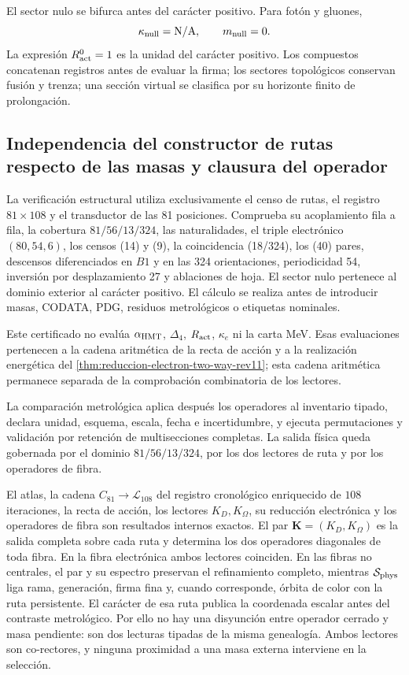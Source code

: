 El sector nulo se bifurca antes del carácter positivo. Para fotón y gluones,
\[
 \kappa_{\rm null}=\mathrm{N/A},
 \qquad m_{\rm null}=0.
\]
La expresión \(R_{\rm act}^{0}=1\) es la unidad del carácter positivo. Los
compuestos concatenan
registros antes de evaluar la firma; los sectores topológicos conservan fusión y
trenza; una sección virtual se clasifica por su horizonte finito de
prolongación.

\subsection{Independencia del constructor de rutas respecto de las masas y clausura del operador}

La verificación estructural utiliza exclusivamente el censo de rutas, el
registro \(81\times108\) y el transductor de las 81 posiciones. Comprueba su
acoplamiento fila a fila, la cobertura
\(81/56/13/324\), las naturalidades, el triple electrónico \((80,54,6)\), los
censos (14) y (9), la coincidencia (18/324), los
(40) pares, descensos diferenciados en \(B1\) y en las 324 orientaciones,
periodicidad 54, inversión por desplazamiento 27 y ablaciones de hoja. El
sector nulo pertenece al dominio exterior al carácter positivo. El cálculo se
realiza antes de introducir masas, CODATA, PDG, residuos metrológicos o
etiquetas nominales.

Este certificado no evalúa \(\alpha_{\rm HMT}\), \(\Delta_4\),
\(R_{\rm act}\), \(\kappa_e\) ni la carta MeV. Esas evaluaciones pertenecen a
la cadena aritmética de la recta de acción y a la realización energética del
\cref{thm:reduccion-electron-two-way-rev11}; esta cadena aritmética permanece
separada de la comprobación combinatoria de los lectores.

La comparación metrológica aplica después los operadores al inventario tipado,
declara unidad, esquema, escala, fecha e incertidumbre, y ejecuta permutaciones
y validación por retención de multisecciones completas. La salida física queda
gobernada por el dominio \(81/56/13/324\), por los dos lectores de ruta y por
los operadores de fibra.

\begin{statusbox}[title={Dominio exacto y realización física cerrada}]
El atlas, la cadena \(C_{81}\to\mathcal L_{108}\) del registro cronológico
enriquecido de \(108\) iteraciones,
la recta de acción,
los lectores \(K_D,K_\Omega\), su reducción electrónica y los operadores de
fibra son resultados internos exactos. El par
\(\mathbf K=(K_D,K_\Omega)\) es la salida completa sobre cada ruta y
determina los dos operadores diagonales de toda fibra. En la fibra
electrónica ambos lectores coinciden. En las fibras no centrales, el par y su
espectro preservan el refinamiento completo, mientras
\(\mathcal S_{\rm phys}\) liga rama, generación, firma fina y, cuando
corresponde, órbita de color con la ruta persistente. El carácter de esa ruta
publica la coordenada escalar antes del contraste metrológico. Por ello no hay
una disyunción entre operador cerrado y masa pendiente: son dos lecturas
tipadas de la misma genealogía. Ambos lectores son co-rectores, y ninguna
proximidad a una masa externa interviene en la selección.
\end{statusbox}
